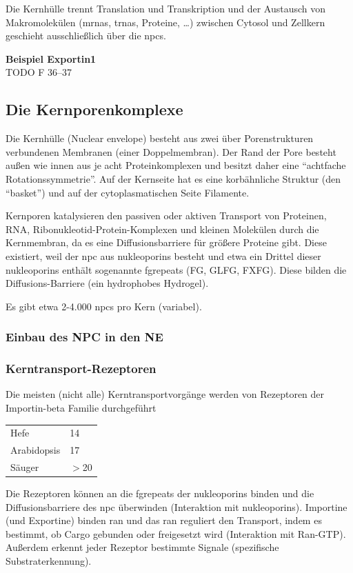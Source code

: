 Die Kernhülle trennt Translation und Transkription und der Austausch von Makromolekülen (\glspl{mrna}, \glspl{trna},
Proteine, \ldots) zwischen Cytosol und Zellkern geschieht ausschließlich über die \glspl{npc}.

\begin{bsp}
    \textbf{Beispiel Exportin1} \\ TODO F 36--37
\end{bsp}

\subsection*{Die Kernporenkomplexe}
Die Kernhülle (Nuclear envelope) besteht aus zwei über Porenstrukturen verbundenen Membranen (einer Doppelmembran).
Der Rand der Pore besteht außen wie innen aus je acht Proteinkomplexen und besitzt daher eine ``achtfache
Rotationssymmetrie''.
Auf der Kernseite hat es eine korbähnliche Struktur (den ``basket'') und auf der cytoplasmatischen
Seite Filamente.

Kernporen katalysieren den passiven oder aktiven Transport von Proteinen, RNA, Ribonukleotid-Protein-Komplexen und
kleinen Molekülen durch die Kernmembran, da es eine Diffusionsbarriere für
größere Proteine gibt.
Diese existiert, weil der \gls{npc} aus \glspl{nukleoporin} besteht und etwa ein Drittel dieser \glspl{nukleoporin} enthält
sogenannte \glspl{fgrepeat} (FG, GLFG, FXFG).
Diese bilden die Diffusions-Barriere (ein hydrophobes Hydrogel).
\cite{Christen2024, Kernpore, vorlesung8}

Es gibt etwa 2-4.000 \glspl{npc}
pro Kern (variabel).

\subsubsection*{Einbau des NPC in den NE}

\subsubsection*{Kerntransport-Rezeptoren}
Die meisten (nicht alle) Kerntransportvorgänge
werden von Rezeptoren der
Importin-beta Familie durchgeführt %
\begin{mytable}
    \begin{tabular}{ll}
        Hefe        & 14    \\
        Arabidopsis & 17    \\
        Säuger      & $>$20
    \end{tabular}
    \caption{Anzahl an Importin-beta Rezeptor-Typen in verschiedenen Organismen.}\label{tab:table5}
\end{mytable}
Die Rezeptoren können an die \glspl{fgrepeat} der \glspl{nukleoporin} binden und die Diffusionsbarriere des \gls{npc}
überwinden (Interaktion mit \glspl{nukleoporin}).
Importine (und Exportine) binden \gls{ran} und das \gls{ran} reguliert den Transport, indem es bestimmt, ob Cargo
gebunden oder freigesetzt wird (Interaktion mit Ran-GTP).
Außerdem erkennt jeder Rezeptor bestimmte Signale (spezifische Substraterkennung).

